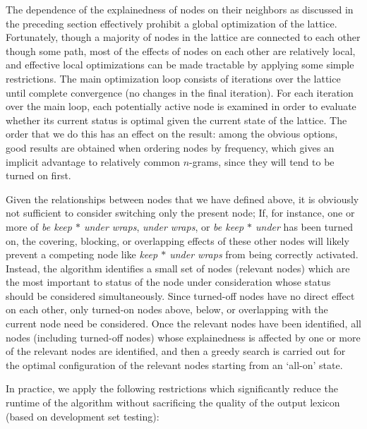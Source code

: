 \documentclass[11pt,letterpaper]{article}
\newcommand{\gap}{$*$\xspace}
\newcommand{\ex}[1]{\textit{#1}\xspace}
\begin{document}
The dependence of the explainedness of nodes on their neighbors as discussed in the preceding section effectively prohibit a global optimization of the lattice. Fortunately, though a majority of nodes in the lattice are connected to each other though some path, most of the effects of nodes on each other are relatively local, and effective local optimizations can be made tractable by applying some simple restrictions. The main optimization loop consists of iterations over the lattice until complete convergence (no changes in the final iteration). For each iteration over the main loop, each potentially active node is examined in order to evaluate whether its current status is optimal given the current state of the lattice. The order that we do this has an effect on the result: among the obvious options, good results are obtained when ordering nodes by frequency, which gives an implicit advantage to relatively common $n$-grams, since they will tend to be turned on first.


Given the relationships between nodes that we have defined above, it is obviously not sufficient to consider switching only the present node; If, for instance, one or more of \ex{be keep \gap under wraps}, \ex{under wraps}, or \ex{be keep \gap under} has been turned on, the covering, blocking, or overlapping effects of these other nodes will likely prevent a competing node like \ex{keep \gap under wraps} from being correctly activated. Instead, the algorithm identifies a small set of nodes (relevant nodes) which are the most important to status of the node under consideration whose status should be considered simultaneously. Since turned-off nodes have no direct effect on each other, only turned-on nodes above, below, or overlapping with the current node need be considered.  Once the relevant nodes have been identified, all nodes (including turned-off nodes) whose explainedness is affected by one or more of the relevant nodes are identified, and then a greedy search is carried out for the optimal configuration of the relevant nodes starting from an `all-on' state. 

In practice, we apply the following restrictions which significantly reduce the runtime of the algorithm without sacrificing the quality of the output lexicon (based on development set testing):
\end{document}
